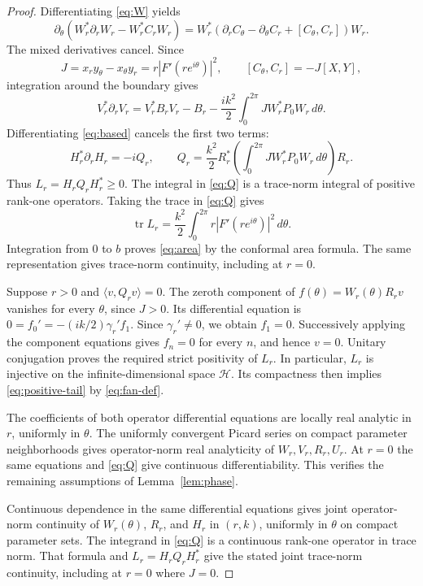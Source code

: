 \documentclass[11pt]{amsart}
\numberwithin{equation}{section}
\newcommand{\Hh}{\mathcal H}
\newcommand{\tr}{\operatorname{tr}}
\newcommand{\ip}[2]{\langle #1,#2\rangle}
\begin{document}
\begin{proof}
Differentiating \eqref{eq:W} yields
\[
 \partial_\theta(W_r^*\partial_rW_r-W_r^*C_rW_r)
 =W_r^*(\partial_rC_\theta-\partial_\theta C_r+[C_\theta,C_r])W_r.
\]
The mixed derivatives cancel. Since
\[
 J=x_ry_\theta-x_\theta y_r=r|F'(re^{i\theta})|^2,
 \qquad [C_\theta,C_r]=-J[X,Y],
\]
integration around the boundary gives
\[
 V_r^*\partial_rV_r
 =V_r^*B_rV_r-B_r-\frac{ik^2}{2}
       \int_0^{2\pi}J W_r^*P_0W_r\,d\theta.
\]
Differentiating \eqref{eq:based} cancels the first two terms:
\begin{equation}\label{eq:Q}
 H_r^*\partial_rH_r=-iQ_r,\qquad
 Q_r=\frac{k^2}{2}R_r^*
       \left(\int_0^{2\pi}J W_r^*P_0W_r\,d\theta\right)R_r.
\end{equation}
Thus $L_r=H_rQ_rH_r^*\ge0$. The integral in \eqref{eq:Q} is a
trace-norm integral of positive rank-one operators.
Taking the trace in \eqref{eq:Q} gives
\[
 \tr L_r=\frac{k^2}{2}\int_0^{2\pi}
       r|F'(re^{i\theta})|^2\,d\theta.
\]
Integration from $0$ to $b$ proves \eqref{eq:area} by the conformal area formula. The same representation gives
trace-norm continuity, including at $r=0$.

Suppose $r>0$ and $\ip v{Q_rv}=0$.
The zeroth component of $f(\theta)=W_r(\theta)R_rv$ vanishes for
every $\theta$, since $J>0$. Its differential equation is
$0=f_0'=-(ik/2)\gamma_r'f_1$. Since $\gamma_r'\ne0$, we obtain
$f_1=0$. Successively applying the component equations gives
$f_n=0$ for every $n$, and hence $v=0$. Unitary conjugation proves
the required strict positivity of $L_r$. In particular, $L_r$
is injective on the infinite-dimensional space $\Hh$. Its compactness
then implies \eqref{eq:positive-tail} by \eqref{eq:fan-def}.

The coefficients of both operator differential equations are locally
real analytic in $r$, uniformly in $\theta$. The uniformly convergent
Picard series on compact parameter neighborhoods gives operator-norm
real analyticity of $W_r,V_r,R_r,U_r$. At $r=0$ the same equations
and \eqref{eq:Q} give continuous differentiability. This verifies
the remaining assumptions of Lemma~\ref{lem:phase}.

Continuous dependence in the same differential equations gives joint
operator-norm continuity of $W_r(\theta)$, $R_r$, and $H_r$ in
$(r,k)$, uniformly in $\theta$ on compact parameter sets.
The integrand in \eqref{eq:Q} is a continuous rank-one operator
in trace norm. That formula and $L_r=H_rQ_rH_r^*$ give the stated
joint trace-norm continuity, including at $r=0$ where $J=0$.
\end{proof}
\end{document}
